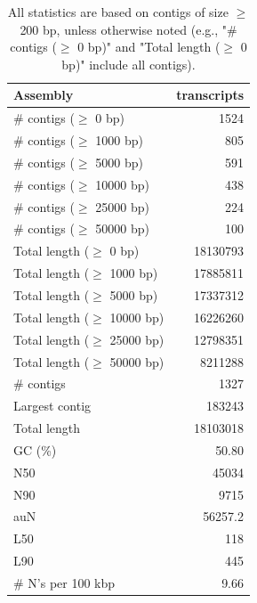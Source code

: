 \documentclass[12pt,a4paper]{article}
\begin{document}
\begin{table}[ht]
\begin{center}
\caption{All statistics are based on contigs of size $\geq$ 200 bp, unless otherwise noted (e.g., "\# contigs ($\geq$ 0 bp)" and "Total length ($\geq$ 0 bp)" include all contigs).}
\begin{tabular}{|l*{1}{|r}|}
\hline
Assembly & transcripts \\ \hline
\# contigs ($\geq$ 0 bp) & 1524 \\ \hline
\# contigs ($\geq$ 1000 bp) & 805 \\ \hline
\# contigs ($\geq$ 5000 bp) & 591 \\ \hline
\# contigs ($\geq$ 10000 bp) & 438 \\ \hline
\# contigs ($\geq$ 25000 bp) & 224 \\ \hline
\# contigs ($\geq$ 50000 bp) & 100 \\ \hline
Total length ($\geq$ 0 bp) & 18130793 \\ \hline
Total length ($\geq$ 1000 bp) & 17885811 \\ \hline
Total length ($\geq$ 5000 bp) & 17337312 \\ \hline
Total length ($\geq$ 10000 bp) & 16226260 \\ \hline
Total length ($\geq$ 25000 bp) & 12798351 \\ \hline
Total length ($\geq$ 50000 bp) & 8211288 \\ \hline
\# contigs & 1327 \\ \hline
Largest contig & 183243 \\ \hline
Total length & 18103018 \\ \hline
GC (\%) & 50.80 \\ \hline
N50 & 45034 \\ \hline
N90 & 9715 \\ \hline
auN & 56257.2 \\ \hline
L50 & 118 \\ \hline
L90 & 445 \\ \hline
\# N's per 100 kbp & 9.66 \\ \hline
\end{tabular}
\end{center}
\end{table}
\end{document}
